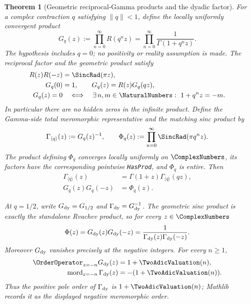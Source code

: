 \documentclass[11pt,oneside]{article}
\newtheorem{theorem}{Theorem}[section]
\theoremstyle{definition}
\theoremstyle{remark}
\newcommand{\lean}[1]{%
  \ifmmode\text{\nolinkurl{#1}}\else\nolinkurl{#1}\fi}
\begin{document}
\begin{theorem}[Geometric reciprocal-Gamma products and the dyadic factor]
For a complex contraction \(q\) satisfying \(\lVert q\rVert<1\), define the
locally uniformly convergent product
\begin{equation}
 G_q(z):=\prod_{n=0}^{\infty}R(q^nz)
 =\prod_{n=0}^{\infty}\frac1{\Gamma(1+q^nz)}.             \label{eq:geometric-reciprocal-gamma}
\end{equation}
The hypothesis includes \(q=0\); no positivity or reality assumption is made.
The reciprocal factor and the geometric product satisfy
\begin{align}
 R(z)R(-z)&=\SincRad(\pi z),                                  \label{eq:reciprocal-gamma-reflection}\\
 G_q(0)&=1,\qquad
 G_q(z)=R(z)G_q(qz),                                      \label{eq:geometric-reciprocal-gamma-mahler}\\
 G_q(z)=0&\quad\Longleftrightarrow\quad
 \exists\,n,m\in\NaturalNumbers:\ 1+q^nz=-m.                          \label{eq:geometric-reciprocal-gamma-zeros}
\end{align}
In particular there are no hidden zeros in the infinite product.  Define the
Gamma-side total meromorphic representative and the matching sinc product by
\begin{equation}
 \Gamma_{\langle q\rangle}(z):=G_q(z)^{-1},\qquad
 \Phi_q(z):=\prod_{n=0}^{\infty}\SincRad(\pi q^nz).
\end{equation}
The product defining \(\Phi_q\) converges locally uniformly on \(\ComplexNumbers\), its factors have the
corresponding pointwise \lean{HasProd}, and \(\Phi_q\) is entire.
Then
\begin{align}
 \Gamma_{\langle q\rangle}(z)
   &=\Gamma(1+z)\Gamma_{\langle q\rangle}(qz),             \label{eq:geometric-gamma-mahler}\\
 G_q(z)G_q(-z)&=\Phi_q(z).                                \label{eq:geometric-gamma-reflection}
\end{align}

At \(q=1/2\), write \(G_{\rm dy}=G_{1/2}\) and
\(\Gamma_{\rm dy}=G_{\rm dy}^{-1}\).  The geometric sinc product is exactly the
standalone Rvachev product, so for every \(z\in\ComplexNumbers\)
\begin{equation}
 \Phi(z)=G_{\rm dy}(z)G_{\rm dy}(-z)
 =\frac1{\Gamma_{\rm dy}(z)\Gamma_{\rm dy}(-z)}.          \label{eq:dyadic-reciprocal-gamma-bridge}
\end{equation}
Moreover \(G_{\rm dy}\) vanishes precisely at the negative integers.  For every
\(n\ge1\),
\begin{align}
 \OrderOperator_{z=-n}G_{\rm dy}(z)&=1+\TwoAdicValuation(n),       \label{eq:dyadic-reciprocal-gamma-order}\\
 \operatorname{mord}_{z=-n}\Gamma_{\rm dy}(z)&=-(1+\TwoAdicValuation(n)).
                                                                  \label{eq:dyadic-gamma-pole-order}
\end{align}
Thus the positive pole order of \(\Gamma_{\rm dy}\) is \(1+\TwoAdicValuation(n)\);
Mathlib records it as the displayed negative meromorphic order.
\end{theorem}
\end{document}
